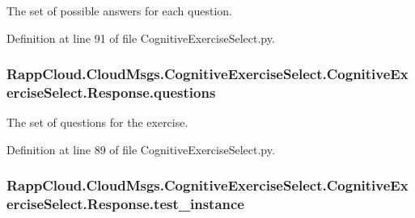 The set of possible answers for each question. 



Definition at line 91 of file Cognitive\-Exercise\-Select.\-py.

\hypertarget{classRappCloud_1_1CloudMsgs_1_1CognitiveExerciseSelect_1_1CognitiveExerciseSelect_1_1Response_adefa61c1a4386dd3b190fb01755156a9}{
\subsubsection[{questions}]{\setlength{\rightskip}{0pt plus 5cm}Rapp\-Cloud.\-Cloud\-Msgs.\-Cognitive\-Exercise\-Select.\-Cognitive\-Exercise\-Select.\-Response.\-questions}}\label{classRappCloud_1_1CloudMsgs_1_1CognitiveExerciseSelect_1_1CognitiveExerciseSelect_1_1Response_adefa61c1a4386dd3b190fb01755156a9}


The set of questions for the exercise. 



Definition at line 89 of file Cognitive\-Exercise\-Select.\-py.

\hypertarget{classRappCloud_1_1CloudMsgs_1_1CognitiveExerciseSelect_1_1CognitiveExerciseSelect_1_1Response_a9e978c59f4c6a3640bdb9cb88a0cf1be}{
\subsubsection[{test\-\_\-instance}]{\setlength{\rightskip}{0pt plus 5cm}Rapp\-Cloud.\-Cloud\-Msgs.\-Cognitive\-Exercise\-Select.\-Cognitive\-Exercise\-Select.\-Response.\-test\-\_\-instance}}\label{classRappCloud_1_1CloudMsgs_1_1CognitiveExerciseSelect_1_1CognitiveExerciseSelect_1_1Response_a9e978c59f4c6a3640bdb9cb88a0cf1be}


